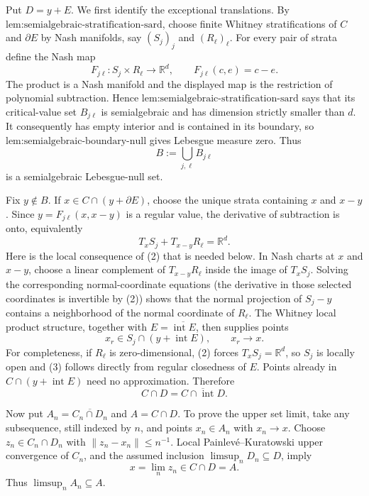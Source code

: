 Put \(D=y+E\).  We first identify the exceptional translations.  By \(\text{lem:semialgebraic-stratification-sard}\), choose finite Whitney stratifications of \(C\) and \(\partial E\) by Nash manifolds, say \((S_j)_j\) and \((R_\ell)_\ell\).  For every pair of strata define the Nash map
\[
 F_{j\ell}:S_j\times R_\ell\longrightarrow\mathbb R^d,
 \qquad F_{j\ell}(c,e)=c-e.
\]
The product is a Nash manifold and the displayed map is the restriction of polynomial subtraction.  Hence \(\text{lem:semialgebraic-stratification-sard}\) says that its critical-value set \(B_{j\ell}\) is semialgebraic and has dimension strictly smaller than \(d\).  It consequently has empty interior and is contained in its boundary, so \(\text{lem:semialgebraic-boundary-null}\) gives Lebesgue measure zero.  Thus
\[
 B:=\bigcup_{j,\ell}B_{j\ell}
 \tag{1}
\]
is a semialgebraic Lebesgue-null set.

Fix \(y\notin B\).  If \(x\in C\cap(y+\partial E)\), choose the unique strata containing \(x\) and \(x-y\).  Since \(y=F_{j\ell}(x,x-y)\) is a regular value, the derivative of subtraction is onto, equivalently
\[
 T_xS_j+T_{x-y}R_\ell=\mathbb R^d.
 \tag{2}
\]
Here is the local consequence of (2) that is needed below.  In Nash charts at \(x\) and \(x-y\), choose a linear complement of \(T_{x-y}R_\ell\) inside the image of \(T_xS_j\).  Solving the corresponding normal-coordinate equations (the derivative in those selected coordinates is invertible by (2)) shows that the normal projection of \(S_j-y\) contains a neighborhood of the normal coordinate of \(R_\ell\).  The Whitney local product structure, together with \(E=\overline{\operatorname{int}E}\), then supplies points
\[
 x_r\in S_j\cap(y+\operatorname{int}E),
 \qquad x_r\longrightarrow x.
 \tag{3}
\]
For completeness, if \(R_\ell\) is zero-dimensional, (2) forces \(T_xS_j=\mathbb R^d\), so \(S_j\) is locally open and (3) follows directly from regular closedness of \(E\).  Points already in \(C\cap(y+\operatorname{int}E)\) need no approximation.  Therefore
\[
 C\cap D=\overline{C\cap\operatorname{int}D}.
 \tag{4}
\]

Now put \(A_n=\overline{C_n\cap D_n}\) and \(A=C\cap D\).  To prove the upper set limit, take any subsequence, still indexed by \(n\), and points \(x_n\in A_n\) with \(x_n\to x\).  Choose \(z_n\in C_n\cap D_n\) with \(\lVert z_n-x_n\rVert\le n^{-1}\).  Local Painlev\'e--Kuratowski upper convergence of \(C_n\), and the assumed inclusion \(\limsup_nD_n\subseteq D\), imply
\[
 x=\lim_nz_n\in C\cap D=A.
 \tag{5}
\]
Thus \(\limsup_nA_n\subseteq A\).

